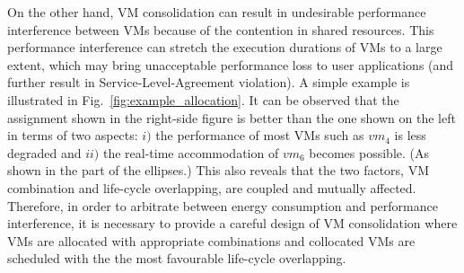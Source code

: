 \documentclass[10pt,journal]{IEEEtran}
\begin{document}
On the other hand, VM consolidation can result in undesirable performance interference between VMs because of the contention in shared resources. This performance interference can stretch the execution durations of VMs to a large extent, which may bring unacceptable performance loss to user applications (and further result in Service-Level-Agreement violation). A simple example is illustrated in Fig.~\ref{fig:example_allocation}. It can be observed that the assignment shown in the right-side figure is better than the one shown on the left in terms of two aspects: $\mathit{i)}$ the performance of most VMs such as $vm_4$ is less degraded and $\mathit{ii)}$ the real-time accommodation of $vm_6$ becomes possible. (As shown in the part of the ellipses.) This also reveals that the two factors, VM combination and life-cycle overlapping, are coupled and mutually affected. Therefore, in order to arbitrate between energy consumption and performance interference, it is necessary to provide a careful design of VM consolidation where VMs are allocated with appropriate combinations and collocated VMs are scheduled with the the most favourable life-cycle overlapping.
\end{document}
